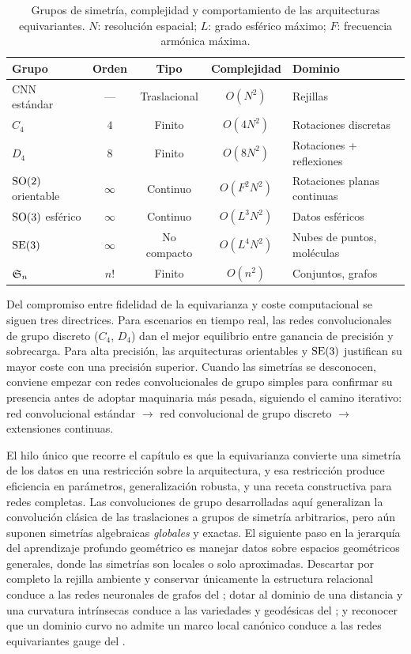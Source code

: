\begin{table}[h]
\centering
\small
\caption{Grupos de simetr\'ia, complejidad y comportamiento de las arquitecturas
equivariantes. $N$: resoluci\'on espacial; $L$: grado esf\'erico m\'aximo; $F$:
frecuencia arm\'onica m\'axima.}
\label{tab:groups:comparison}
\begin{tabular}{@{}lcccl@{}}
\toprule
\textbf{Grupo} & \textbf{Orden} & \textbf{Tipo} & \textbf{Complejidad} & \textbf{Dominio} \\
\midrule
CNN est\'andar & --- & Traslacional & $O(N^2)$ & Rejillas \\
$C_4$ & $4$ & Finito & $O(4 N^2)$ & Rotaciones discretas \\
$D_4$ & $8$ & Finito & $O(8 N^2)$ & Rotaciones + reflexiones \\
$\operatorname{SO}(2)$ orientable & $\infty$ & Continuo & $O(F^2 N^2)$ & Rotaciones planas continuas \\
$\operatorname{SO}(3)$ esf\'erico & $\infty$ & Continuo & $O(L^3 N^2)$ & Datos esf\'ericos \\
$\operatorname{SE}(3)$ & $\infty$ & No compacto & $O(L^4 N^2)$ & Nubes de puntos, mol\'eculas \\
$\mathfrak{S}_n$ & $n!$ & Finito & $O(n^2)$ & Conjuntos, grafos \\
\bottomrule
\end{tabular}
\end{table}

Del compromiso entre fidelidad de la equivarianza y coste computacional se siguen
tres directrices. Para escenarios en tiempo real, las redes convolucionales de
grupo discreto ($C_4$, $D_4$) dan el mejor equilibrio entre ganancia de precisi\'on
y sobrecarga. Para alta precisi\'on, las arquitecturas orientables y $\operatorname{SE}(3)$
justifican su mayor coste con una precisi\'on superior. Cuando las simetr\'ias se
desconocen, conviene empezar con redes convolucionales de grupo simples para
confirmar su presencia antes de adoptar maquinaria m\'as pesada, siguiendo el
camino iterativo: red convolucional est\'andar $\to$ red convolucional de grupo
discreto $\to$ extensiones continuas.

El hilo \'unico que recorre el cap\'itulo es que la equivarianza convierte una
simetr\'ia de los datos en una restricci\'on sobre la arquitectura, y esa
restricci\'on produce eficiencia en par\'ametros, generalizaci\'on robusta, y una
receta constructiva para redes completas. Las convoluciones de grupo
desarrolladas aqu\'i generalizan la convoluci\'on cl\'asica de las traslaciones a
grupos de simetr\'ia arbitrarios, pero a\'un suponen simetr\'ias algebraicas
\emph{globales} y exactas. El siguiente paso en la jerarqu\'ia del aprendizaje
profundo geom\'etrico es manejar datos sobre espacios geom\'etricos generales,
donde las simetr\'ias son locales o solo aproximadas. Descartar por completo la
rejilla ambiente y conservar \'unicamente la estructura relacional conduce a las
redes neuronales de grafos del ; dotar al dominio de una distancia
y una curvatura intr\'insecas conduce a las variedades y geod\'esicas del
; y reconocer que un dominio curvo no admite un marco local
can\'onico conduce a las redes equivariantes gauge del .

